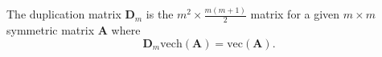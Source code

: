 The duplication matrix $\mathbf{D}_{m}$ is the
$m^2 \times \frac{m \left( m + 1 \right)}{2}$
matrix
for a given $m \times m$ symmetric matrix $\mathbf{A}$
where
\begin{equation}
   \mathbf{D}_{m} \mathrm{vech} \left( \mathbf{A} \right)
   =
   \mathrm{vec} \left( \mathbf{A} \right) .
\end{equation}